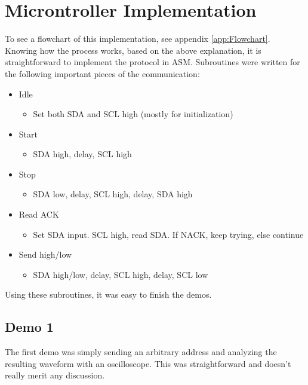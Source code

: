 \documentclass{article}
\begin{document}
\newpage
\section{Microntroller Implementation}
\label{sec:MCUImplementation}

To see a flowchart of this implementation, see appendix \ref{app:Flowchart}.\\

\noindent Knowing how the process works, based on the above explanation, it is straightforward to implement the protocol in ASM. Subroutines were written for the following important pieces of the communication:

\begin{itemize}
	\item Idle
	\begin{itemize}
		\item Set both SDA and SCL high (mostly for initialization)
	\end{itemize}
	\item Start
	\begin{itemize}
		\item SDA high, delay, SCL high
	\end{itemize}
	\item Stop
	\begin{itemize}
		\item SDA low, delay, SCL high, delay, SDA high
	\end{itemize}
	\item Read ACK
	\begin{itemize}
		\item Set SDA input. SCL high, read SDA. If NACK, keep trying, else continue
	\end{itemize}
	\item Send high/low
	\begin{itemize}
		\item SDA high/low, delay, SCL high, delay, SCL low
	\end{itemize}
\end{itemize}

\noindent Using these subroutines, it was easy to finish the demos.\\


\subsection{Demo 1}

The first demo was simply sending an arbitrary address and analyzing the resulting waveform with an oscilloscope. This was straightforward and doesn't really merit any discussion.\\
\end{document}
